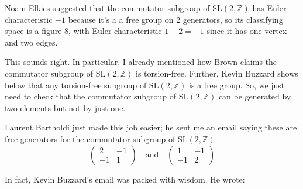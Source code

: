 \documentclass{article}
\begin{document}
Noam Elkies suggested that the commutator subgroup of
\(\mathrm{SL}(2,\mathbb{Z})\) has Euler characteristic \(-1\) because
it's a a free group on 2 generators, so its classifying space is a
figure 8, with Euler characteristic \(1 - 2 = -1\) since it has one
vertex and two edges.

This sounds right. In particular, I already mentioned how Brown claims
the commutator subgroup of \(\mathrm{SL}(2,\mathbb{Z})\) is
torsion-free. Further, Kevin Buzzard shows below that any torsion-free
subgroup of \(\mathrm{SL}(2,\mathbb{Z})\) is a free group. So, we just
need to check that the commutator subgroup of
\(\mathrm{SL}(2,\mathbb{Z})\) can be generated by two elements but not
by just one.

Laurent Bartholdi just made this job easier; he sent me an email saying
these are free generators for the commutator subgroup of
\(\mathrm{SL}(2,\mathbb{Z})\): \[
  \left(
    \begin{array}{rr}
      2&-1\\-1&1
    \end{array}
  \right)
  \quad\mbox{and}\quad
  \left(
    \begin{array}{rr}
      1&-1\\-1&2
    \end{array}
  \right)
\]

In fact, Kevin Buzzard's email was packed with wisdom. He wrote:
\end{document}
